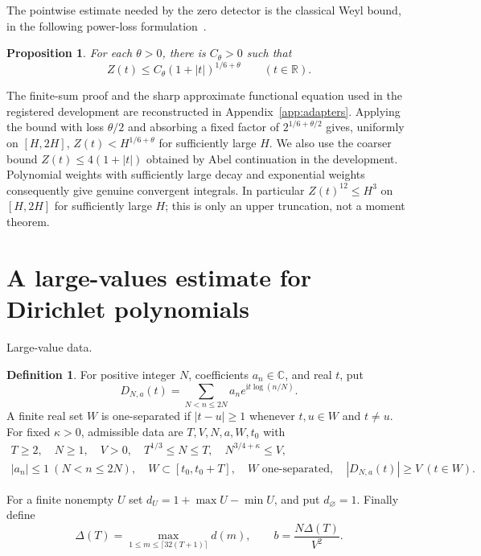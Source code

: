 \documentclass[11pt,a4paper]{article}
\numberwithin{equation}{section}
\newtheorem{proposition}[theorem]{Proposition}
\theoremstyle{definition}
\newtheorem{definition}[theorem]{Definition}
\newcommand{\R}{\mathbb R}
\newcommand{\C}{\mathbb C}
\newcommand{\ii}{\mathrm i}
\begin{document}
The pointwise estimate needed by the zero detector is the classical
Weyl bound, in the following power-loss formulation~\cite{ivic,titchmarsh}.
\begin{proposition}\label{prop:weyl}
For each $\theta>0$, there is $C_\theta>0$ such that
\[
 Z(t)\le C_\theta(1+|t|)^{1/6+\theta}\qquad(t\in\R).
\]
\end{proposition}
The finite-sum proof and the sharp approximate functional equation used in
the registered development are reconstructed in Appendix~\ref{app:adapters}.
Applying the bound with loss $\theta/2$ and absorbing a fixed factor of
$2^{1/6+\theta/2}$ gives, uniformly on $[H,2H]$,
$Z(t)<H^{1/6+\theta}$ for sufficiently large $H$.
We also use the coarser bound $Z(t)\le4(1+|t|)$ obtained by Abel
continuation in the development. Polynomial weights with sufficiently
large decay and exponential weights consequently give genuine convergent
integrals. In particular $Z(t)^{12}\le H^3$ on $[H,2H]$ for sufficiently
large $H$; this is only an upper truncation, not a moment theorem.

\section{A large-values estimate for Dirichlet polynomials}
\label{sec:typeI}
\par\medskip\noindent Large-value data.
\begin{definition}
For positive integer $N$, coefficients $a_n\in\C$, and real $t$, put
\[
 D_{N,a}(t)=\sum_{N<n\le2N}a_n e^{\ii t\log(n/N)}.
\]
A finite real set $W$ is one-separated if $|t-u|\ge1$ whenever $t,u\in W$
and $t\ne u$. For fixed $\kappa>0$, admissible data are
$T,V,N,a,W,t_0$ with
\begin{gather*}
 T\ge2,\quad N\ge1,\quad V>0,\quad T^{1/3}\le N\le T,\quad
 N^{3/4+\kappa}\le V,\\
 |a_n|\le1\ (N<n\le2N),\quad W\subset[t_0,t_0+T],\quad
 W\text{ one-separated},\quad |D_{N,a}(t)|\ge V\ (t\in W).
\end{gather*}

For a finite nonempty $U$ set $d_U=1+\max U-\min U$, and put $d_\varnothing=1$.
Finally define
\[
 \Delta(T)=\max_{1\le m\le\lceil32(T+1)\rceil}d(m),\qquad
 b=\frac{N\Delta(T)}{V^2}.
\]
\end{definition}
\end{document}
